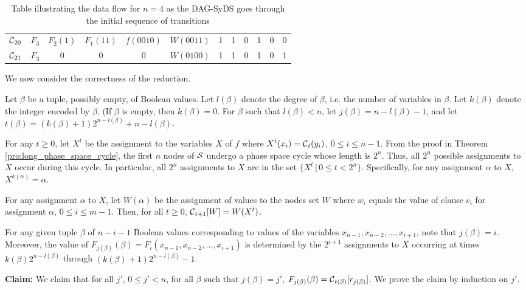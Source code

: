\begin{table*}
\begin{center}
\begin{tabular}{|l | c c c c c c c c c c c |}
$\mbox{$\mathcal{C}$}_{20}$ & $F_3$ & $F_2(1)$ & $F_1(11)$ & $f(0010)$ & $W(0011)$ & 1 & 1 & 0 & 1 & 0 & 0 \\ 
$\mbox{$\mathcal{C}$}_{21}$ & $F_3$ & 0 & 0 & 0 & $W(0100)$ & 1 & 1 & 0 & 1 & 0 & 1 \\ 
\end{tabular}
\end{center}
\caption{Table illustrating the data flow for $n = 4$ 
as the DAG-SyDS \cals{} goes through the initial sequence of transitions}
\label{tab:dag_syds_trans}
\end{table*}

\bigskip
We now consider the correctness of the reduction.

Let $\beta$ be a tuple, possibly empty, of Boolean values. 
Let  $l(\beta)$ denote the degree of $\beta$,
i.e. the number of variables in $\beta$.
Let  $k(\beta)$ denote the integer encoded by $\beta$.
(If  $\beta$ is empty, then $k(\beta) = 0$.
For $\beta$ such that $l(\beta) < n$, 
let $j(\beta) = n - l(\beta) -1$,
and let $t(\beta) = (k(\beta)+1) 2^{n-l(\beta)} +n -l(\beta)$. 

For any $ t \geq 0$,
let  $X^t$ be the assignment to the variables $X$ of $f$ where 
$X^t(x_i) = \mbox{$\mathcal{C}$} _t(y_i)$, $ 0 \leq i \leq n-1$.
From the proof in Theorem \ref{pro:long_phase_space_cycle}, 
the first $n$ nodes of $\mbox{$\mathcal{S}$}$ undergo a phase space cycle whose length is $2^n$.
Thus, all $2^n$ possible assignments to $X$ occur during this cycle.
In particular, all $2^n$ assignments to $X$ are in the set $\{  X^t \, | \, 0 \leq t < 2^n \}$.
Specifically, for any assignment $\alpha$ to $X$, $X^{k(\alpha)} = \alpha$.


For any assignment $\alpha$ to $X$, 
let $W(\alpha)$ be the assignment of values to the nodes set $W$ 
where $w_i$ equals the value of clause $c_i$ for assignment $\alpha$, $ 0 \leq i \leq m-1$.
Then,  for all $t \geq 0$, $\mbox{$\mathcal{C}$}_{t+1}[W] = W(X^t)$.

For any given tuple $\beta$ of  $n-i-1$ Boolean values 
corresponding to values of the variables $x_{n-1}, x_{n-2}, \ldots , x_{i+1}$,
note that $j(\beta) = i$.
Moreover, the value of $F_{j(\beta)}(\beta) = F_i(x_{n-1}, x_{n-2}, \ldots , x_{i+1})$
is determined by the $2^{i+1}$ assignments to $X$  occurring at times 
$k(\beta) 2^{n-l(\beta)}$ through $(k(\beta)+1) 2^{n-l(\beta)}-1$.

{\bf Claim:} We claim that for all $j'$, $0 \leq j' < n$,
for all $\beta$ such that $j(\beta) = j'$,
$F_{j(\beta)}(\beta) =\mbox{$\mathcal{C}$}_{t(\beta)}[r_{j(\beta)}]$.
We prove the claim by induction on $j'$.

